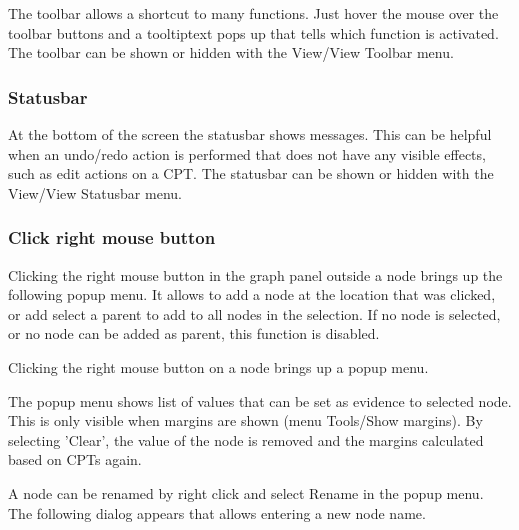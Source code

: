 \begin{center}
\end{center}

The toolbar allows a shortcut to many functions. Just hover the mouse
over the toolbar buttons and a tooltiptext pops up that tells which 
function is activated. The toolbar can be shown or hidden with the View/View 
Toolbar menu.

\subsubsection*{Statusbar}

At the bottom of the screen the statusbar shows messages. This can be 
helpful when an undo/redo action is performed that does not have any
visible effects, such as edit actions on a CPT. The statusbar can be shown 
or hidden with the View/View Statusbar menu.

\subsubsection*{Click right mouse button}

Clicking the right mouse button in the graph panel outside a node
brings up the following popup menu. It allows to add a node
at the location that was clicked, or add select a parent to
add to all nodes in the selection. If no node is selected, or no node
can be added as parent, this function is disabled.
\begin{center}
\end{center}

Clicking the right mouse button on a node brings up a popup menu.

The popup menu shows list of values that can be set as evidence to selected node.
This is only visible when margins are shown (menu Tools/Show margins).
By selecting 'Clear', the value of the node is removed and the margins
calculated based on CPTs again.
\begin{center}
\end{center}
	
A node can be renamed by right click and select Rename in the popup menu.
The following dialog appears that allows entering a new node name.
\begin{center}
\end{center}



